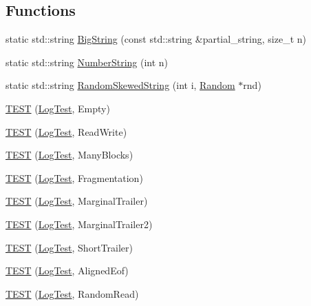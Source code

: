 \subsection*{Functions}
\begin{DoxyCompactItemize}
\item 
static std\+::string \hyperlink{namespaceleveldb_1_1log_a211dcbca77b4ff487c70016c09af674e}{Big\+String} (const std\+::string \&partial\+\_\+string, size\+\_\+t n)
\item 
static std\+::string \hyperlink{namespaceleveldb_1_1log_a851536d606f5ecc9857ee45430a23465}{Number\+String} (int n)
\item 
static std\+::string \hyperlink{namespaceleveldb_1_1log_a4f28769ffa840923fea43c6825a6a0e2}{Random\+Skewed\+String} (int i, \hyperlink{classleveldb_1_1_random}{Random} $\ast$rnd)
\item 
\hyperlink{namespaceleveldb_1_1log_ab8a02b9419477420eca51cfd47d5f172}{T\+E\+S\+T} (\hyperlink{classleveldb_1_1log_1_1_log_test}{Log\+Test}, Empty)
\item 
\hyperlink{namespaceleveldb_1_1log_aabca07adceffd87baf38b81665d92bb4}{T\+E\+S\+T} (\hyperlink{classleveldb_1_1log_1_1_log_test}{Log\+Test}, Read\+Write)
\item 
\hyperlink{namespaceleveldb_1_1log_a60249ea325a8656fdc31898d7c5f4ad9}{T\+E\+S\+T} (\hyperlink{classleveldb_1_1log_1_1_log_test}{Log\+Test}, Many\+Blocks)
\item 
\hyperlink{namespaceleveldb_1_1log_ac15e5779ff43d83522727b8cc44882a2}{T\+E\+S\+T} (\hyperlink{classleveldb_1_1log_1_1_log_test}{Log\+Test}, Fragmentation)
\item 
\hyperlink{namespaceleveldb_1_1log_a9721de928c01ac50b5770b8b4cbb98e1}{T\+E\+S\+T} (\hyperlink{classleveldb_1_1log_1_1_log_test}{Log\+Test}, Marginal\+Trailer)
\item 
\hyperlink{namespaceleveldb_1_1log_aad9c4a11c674359115f4d16c97e33ad1}{T\+E\+S\+T} (\hyperlink{classleveldb_1_1log_1_1_log_test}{Log\+Test}, Marginal\+Trailer2)
\item 
\hyperlink{namespaceleveldb_1_1log_a1a1972ff9493353cfb4546cacd33ddb7}{T\+E\+S\+T} (\hyperlink{classleveldb_1_1log_1_1_log_test}{Log\+Test}, Short\+Trailer)
\item 
\hyperlink{namespaceleveldb_1_1log_a55d554f8c576d9d4d99e35d3fe0c169f}{T\+E\+S\+T} (\hyperlink{classleveldb_1_1log_1_1_log_test}{Log\+Test}, Aligned\+Eof)
\item 
\hyperlink{namespaceleveldb_1_1log_a52d33034be964c0d0e40efdf4b423452}{T\+E\+S\+T} (\hyperlink{classleveldb_1_1log_1_1_log_test}{Log\+Test}, Random\+Read)

\end{DoxyCompactItemize}
